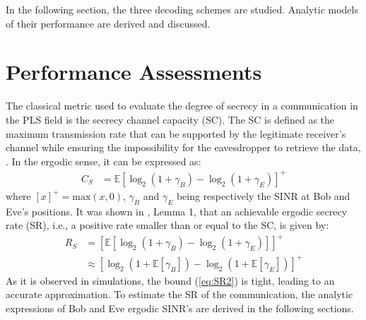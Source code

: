\documentclass[journal,comsoc]{IEEEtran}
\let\MYoriglatexcaption\caption
\renewcommand{\caption}[2][\relax]{\MYoriglatexcaption[#2]{#2}}
\newcommand{\EX}[1]{\mathbb{E} \left[#1\right]}%
\begin{document}
In the following section, the three decoding schemes are studied. Analytic models of their performance are derived and discussed.




%
%
%










\section{Performance Assessments}
\label{sec:perf}
The classical metric used to evaluate the degree of secrecy in a communication in the PLS field is the secrecy channel capacity (SC). The SC is defined as the maximum transmission rate that can be supported by the legitimate receiver's channel while ensuring the impossibility for the eavesdropper to retrieve the data, \cite{7348007}. In the ergodic sense, it can be expressed as:
\begin{equation}
\begin{split}
C_S &=  \EX{\log_2{\left(1+\gamma_B\right)} - \log_2{\left(1+\gamma_E\right)}}^+ 
\end{split}
\label{eq:SR}
\end{equation}
where $\left[x\right]^+ = \text{max}(x,0)$,  $\gamma_B$ and $\gamma_E$ being respectively the SINR at Bob and Eve's positions.  It was shown in \cite{8418798}, Lemma 1, that an achievable ergodic secrecy rate (SR), i.e., a positive rate smaller than or equal to the SC, is given by:
\begin{equation}
	\begin{split}
		R_S& = \left[\EX{\log_2(1+\gamma_B)-\log_2(1+\gamma_E)}\right]^+ \\
		& \approx \left[ \log_2(1 + \EX{\gamma_B}) - \log_2(1 + \EX{\gamma_E})\right]^+
	\end{split}
	\label{eq:SR2}
\end{equation}
As it is observed in simulations, the bound (\ref{eq:SR2}) is tight, leading to an accurate approximation. To estimate the SR of the communication, the analytic expressions of Bob and Eve ergodic SINR's are derived in the following sections.
\end{document}
